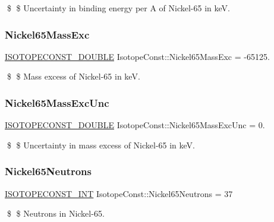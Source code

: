 \$ \$ Uncertainty in binding energy per A of Nickel-\/65 in keV. \mbox{\label{group___isotope_const-_nickel-_ni65_gaace1752d35aa6371bb152a1ccf972e3b}} 
\subsubsection{\texorpdfstring{Nickel65\+Mass\+Exc}{Nickel65MassExc}}
{\footnotesize\ttfamily \mbox{\hyperlink{group___isotope_const-_macros_ga8f45a7272ce02c0b4c65c44636ed719a}{I\+S\+O\+T\+O\+P\+E\+C\+O\+N\+S\+T\+\_\+\+D\+O\+U\+B\+LE}} Isotope\+Const\+::\+Nickel65\+Mass\+Exc = -\/65125.}

\$ \$ Mass excess of Nickel-\/65 in keV. \mbox{\label{group___isotope_const-_nickel-_ni65_gad3c11ee2824cd29de7da56aa28f03afd}} 
\subsubsection{\texorpdfstring{Nickel65\+Mass\+Exc\+Unc}{Nickel65MassExcUnc}}
{\footnotesize\ttfamily \mbox{\hyperlink{group___isotope_const-_macros_ga8f45a7272ce02c0b4c65c44636ed719a}{I\+S\+O\+T\+O\+P\+E\+C\+O\+N\+S\+T\+\_\+\+D\+O\+U\+B\+LE}} Isotope\+Const\+::\+Nickel65\+Mass\+Exc\+Unc = 0.}

\$ \$ Uncertainty in mass excess of Nickel-\/65 in keV. \mbox{\label{group___isotope_const-_nickel-_ni65_ga3b7030d3cb3b34f8fae9f1fef11c3316}} 
\subsubsection{\texorpdfstring{Nickel65\+Neutrons}{Nickel65Neutrons}}
{\footnotesize\ttfamily \mbox{\hyperlink{group___isotope_const-_macros_ga5f18360b3e99483a35c32d789e62621c}{I\+S\+O\+T\+O\+P\+E\+C\+O\+N\+S\+T\+\_\+\+I\+NT}} Isotope\+Const\+::\+Nickel65\+Neutrons = 37}

\$ \$ Neutrons in Nickel-\/65. \mbox{\label{group___isotope_const-_nickel-_ni65_gab940b9d83fe1884dc3c862e64dadc2df}} 
